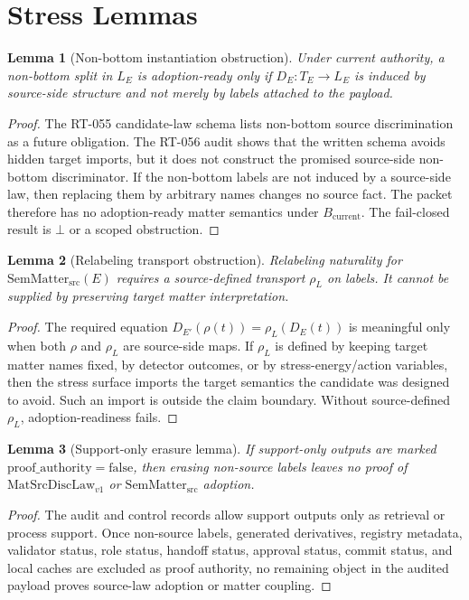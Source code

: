 \documentclass[11pt]{article}
\newcommand{\MatSrcDiscLaw}{\mathrm{MatSrcDiscLaw}_{v1}}
\newcommand{\SemMatterSrc}{\mathrm{SemMatter}_{\mathrm{src}}}
\newcommand{\Bottom}{\bot}
\newcommand{\Bcur}{B_{\mathrm{current}}}
\newcommand{\ProofAuthFalse}{\mathrm{proof\_authority=false}}
\newtheorem{lemma}{Lemma}
\begin{document}
\section{Stress Lemmas}

\begin{lemma}[Non-bottom instantiation obstruction]
Under current authority, a non-bottom split in \(L_E\) is adoption-ready only
if \(D_E:T_E\to L_E\) is induced by source-side structure and not merely by
labels attached to the payload.
\end{lemma}

\begin{proof}
The RT-055 candidate-law schema lists non-bottom source discrimination as a
future obligation. The RT-056 audit shows that the written schema avoids
hidden target imports, but it does not construct the promised source-side
non-bottom discriminator. If the non-bottom labels are not induced by a
source-side law, then replacing them by arbitrary names changes no source
fact. The packet therefore has no adoption-ready matter semantics under
\(\Bcur\). The fail-closed result is \(\Bottom\) or a scoped obstruction.
\end{proof}

\begin{lemma}[Relabeling transport obstruction]
Relabeling naturality for \(\SemMatterSrc(E)\) requires a source-defined
transport \(\rho_L\) on labels. It cannot be supplied by preserving target
matter interpretation.
\end{lemma}

\begin{proof}
The required equation \(D_{E'}(\rho(t))=\rho_L(D_E(t))\) is meaningful only
when both \(\rho\) and \(\rho_L\) are source-side maps. If \(\rho_L\) is
defined by keeping target matter names fixed, by detector outcomes, or by
stress-energy/action variables, then the stress surface imports the target
semantics the candidate was designed to avoid. Such an import is outside the
claim boundary. Without source-defined \(\rho_L\), adoption-readiness fails.
\end{proof}

\begin{lemma}[Support-only erasure lemma]
If support-only outputs are marked \(\ProofAuthFalse\), then erasing
non-source labels leaves no proof of \(\MatSrcDiscLaw\) or \(\SemMatterSrc\)
adoption.
\end{lemma}

\begin{proof}
The audit and control records allow support outputs only as retrieval or
process support. Once non-source labels, generated derivatives, registry
metadata, validator status, role status, handoff status, approval status,
commit status, and local caches are excluded as proof authority, no remaining
object in the audited payload proves source-law adoption or matter coupling.
\end{proof}
\end{document}
